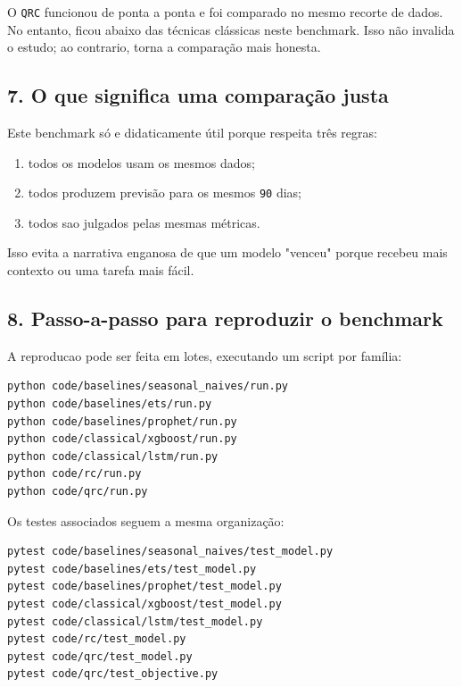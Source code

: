 \documentclass[12pt]{article}
\providecommand{\tightlist}{%
          \setlength{\itemsep}{0pt}\setlength{\parskip}{0pt}}
\begin{document}
O \texttt{QRC} funcionou de ponta a ponta e foi comparado no mesmo recorte de dados. No entanto, ficou abaixo das técnicas clássicas neste benchmark. Isso não invalida o estudo; ao contrario, torna a comparação mais honesta.

\subsection{7. O que significa uma comparação justa}\label{7-o-que-significa-uma-comparauxe7uxe3o-justa}

Este benchmark só e didaticamente útil porque respeita três regras:

\begin{enumerate}
\def\labelenumi{\arabic{enumi}.}
\tightlist
\item
  todos os modelos usam os mesmos dados;
\item
  todos produzem previsão para os mesmos \texttt{90} dias;
\item
  todos sao julgados pelas mesmas métricas.
\end{enumerate}

Isso evita a narrativa enganosa de que um modelo "venceu" porque recebeu mais contexto ou uma tarefa mais fácil.

\subsection{8. Passo-a-passo para reproduzir o benchmark}\label{8-passo-a-passo-para-reproduzir-o-benchmark}

A reproducao pode ser feita em lotes, executando um script por família:

\begin{verbatim}
python code/baselines/seasonal_naives/run.py
python code/baselines/ets/run.py
python code/baselines/prophet/run.py
python code/classical/xgboost/run.py
python code/classical/lstm/run.py
python code/rc/run.py
python code/qrc/run.py
\end{verbatim}

Os testes associados seguem a mesma organização:

\begin{verbatim}
pytest code/baselines/seasonal_naives/test_model.py
pytest code/baselines/ets/test_model.py
pytest code/baselines/prophet/test_model.py
pytest code/classical/xgboost/test_model.py
pytest code/classical/lstm/test_model.py
pytest code/rc/test_model.py
pytest code/qrc/test_model.py
pytest code/qrc/test_objective.py
\end{verbatim}
\end{document}
